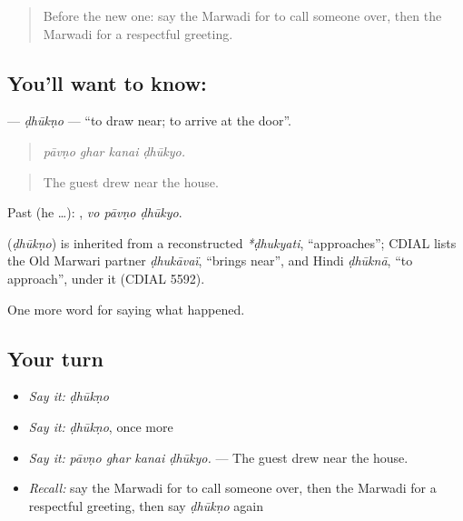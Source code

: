 \label{lesson:MW-C245-dhukno}



\begin{quote}
Before the new one: say the Marwadi for to call someone over, then the Marwadi for a respectful greeting.
\end{quote}

\subsection*{You'll want to know: }
\textbf{} — \emph{ḍhūkṇo} — \textquotedblleft{}to draw near; to arrive at the door\textquotedblright{}.

\begin{quote}
   
\end{quote}

\begin{quote}
\emph{pāvṇo ghar kanai ḍhūkyo.}
\end{quote}

\begin{quote}
The guest drew near the house.
\end{quote}

Past (he …):   , \emph{vo pāvṇo ḍhūkyo}.

\begin{cousinweb}
\textbf{} (\emph{ḍhūkṇo}) is inherited from a reconstructed \emph{*ḍhukyati}, \textquotedblleft{}approaches\textquotedblright{}; CDIAL lists the Old Marwari partner \emph{ḍhukāvaï}, \textquotedblleft{}brings near\textquotedblright{}, and Hindi \emph{ḍhūknā}, \textquotedblleft{}to approach\textquotedblright{}, under it (CDIAL 5592).
\end{cousinweb}

\begin{grammarlens}[title={What you've built}]
One more word for saying what happened.
\end{grammarlens}

\subsection*{Your turn}
\begin{itemize}
\raggedright
  \item \emph{Say it:} \emph{ḍhūkṇo}
  \item \emph{Say it:} \emph{ḍhūkṇo}, once more
  \item \emph{Say it:} \emph{pāvṇo ghar kanai ḍhūkyo.} — The guest drew near the house.
  \item \emph{Recall:} say the Marwadi for to call someone over, then the Marwadi for a respectful greeting, then say \emph{ḍhūkṇo} again
\end{itemize}

